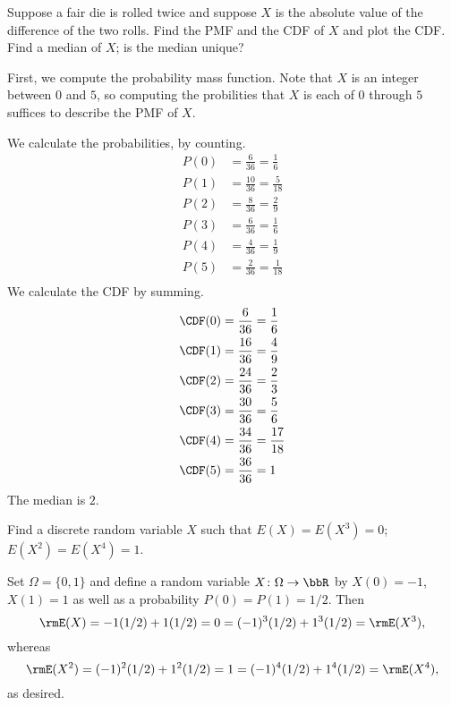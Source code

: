 \begin{problem}[Handout 6, \# 5]
  Suppose a fair die is rolled twice and suppose \(X\) is the absolute
  value of the difference of the two rolls. Find the PMF and the CDF of
  \(X\) and plot the CDF. Find a median of \(X\); is the median unique?
\end{problem}
\begin{solution}

  First, we compute the probability mass function. Note that $X$ is an
  integer between $0$ and $5$, so computing the probilities that $X$ is
  each of $0$ through $5$ suffices to describe the PMF of $X$.

  We calculate the probabilities, by counting.
  \begin{align*}
    P(0) &= \frac{6}{36} = \frac{1}{6}\\
    P(1) &= \frac{10}{36} = \frac{5}{18}\\
    P(2) &= \frac{8}{36} = \frac{2}{9}\\
    P(3) &= \frac{6}{36} = \frac{1}{6}\\
    P(4) &= \frac{4}{36} = \frac{1}{9}\\
    P(5) &= \frac{2}{36} = \frac{1}{18}\\
  \end{align*}
  We calculate the CDF by summing.
  \begin{align*}
    \CDF(0) &= \frac{6}{36} = \frac{1}{6}\\
    \CDF(1) &= \frac{16}{36} = \frac{4}{9}\\
    \CDF(2) &= \frac{24}{36} = \frac{2}{3}\\
    \CDF(3) &= \frac{30}{36} = \frac{5}{6}\\
    \CDF(4) &= \frac{34}{36} = \frac{17}{18}\\
    \CDF(5) &= \frac{36}{36} = 1\\
  \end{align*}
  The median is $2$.
\end{solution}
\newpage

\begin{problem}[Handout 6, \# 7]
  Find a discrete random variable \(X\) such that \(E(X)=E(X^3)=0\);
  \(E(X^2)=E(X^4)=1\).
\end{problem}
\begin{solution}
  Set \(\Omega=\{0,1\}\) and define a random variable
  \(X\colon\Omega\to\bbR\) by \(X(0)= -1\), \(X(1)= 1\) as well as a
  probability \(P(0)=P(1)=1/2\). Then
  \[
    \rmE(X)=-1(1/2)+1(1/2)=0=(-1)^3(1/2)+1^3(1/2)=\rmE(X^3),
  \]
  whereas
  \[
    \rmE(X^2)=(-1)^2(1/2)+1^2(1/2)=1=(-1)^4(1/2)+1^4(1/2)=\rmE(X^4),
  \]
  as desired.
\end{solution}
\newpage

